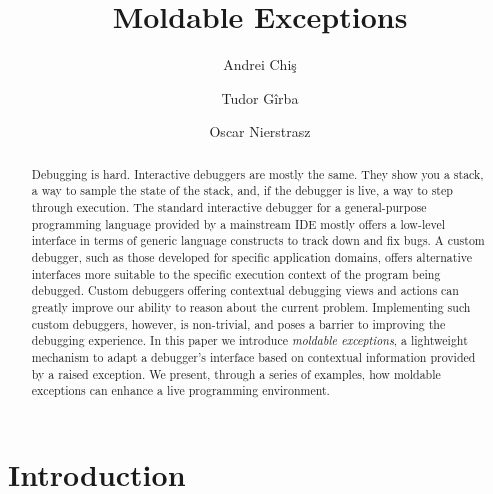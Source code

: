 \documentclass[sigplan,10pt]{acmart}
\begin{document}
\title{Moldable Exceptions}
\author{Andrei Chi\c{s}}
\author{Tudor G\^irba}
\author{Oscar Nierstrasz}

\renewcommand{\shortauthors}{Chi\c{s} et al.}

\begin{abstract}
Debugging is hard.
Interactive debuggers are mostly the same.
They show you a stack, a way to sample the state of the stack, and, if the debugger is live, a way to step through execution.
The standard interactive debugger for a general-purpose programming language provided by a mainstream IDE mostly offers a low-level interface in terms of generic language constructs to track down and fix bugs.
A custom debugger, such as those developed for specific application domains, offers alternative interfaces more suitable to the specific execution context of the program being debugged.
Custom debuggers offering contextual debugging views and actions can greatly improve our ability to reason about the current problem.
Implementing such custom debuggers, however, is non-trivial, and poses a barrier to improving the debugging experience.
In this paper we introduce \emph{moldable exceptions}, a lightweight mechanism to adapt a debugger's interface based on contextual information provided by a raised exception.
We present, through a series of examples, how moldable exceptions can enhance a live programming environment.
\end{abstract}



\maketitle

\section{Introduction}\label{sec:intro}

\end{document}
